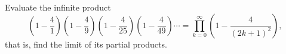 Evaluate the infinite product
\[
\left(1-\dfrac{4}{1}\right)\left(1-\dfrac{4}{9}\right)\left(1-\dfrac{4}{25}\right)\left(1-\dfrac{4}{49}\right)\cdots=\prod_{k=0}^{\infty}\left(1-\dfrac{4}{(2k+1)^2}\right),
\]
that is, find the limit of its partial products.
